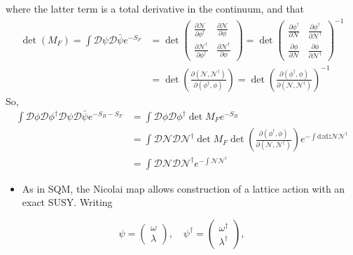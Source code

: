 where the latter term is a total derivative in the continuum, and that
\begin{align}
    \operatorname{det}(M_F) = \int \mathcal{D}\psi \mathcal{D} \bar{\psi}e^{-S_F} &= \operatorname{det} \begin{pmatrix}
        \frac{\partial \mathcal{N}}{\partial \phi^\dagger} & \frac{\partial \mathcal{N}}{\partial \phi} \\
         \frac{\partial \mathcal{N}^\dagger}{\partial \phi^\dagger} & \frac{\partial \mathcal{N}^\dagger}{\partial \phi}
    \end{pmatrix} = \operatorname{det}\begin{pmatrix}
        \frac{\partial \phi^\dagger}{\partial \mathcal{N}} & \frac{\partial \phi^\dagger}{\partial \mathcal{N}^\dagger} \\
        \frac{\partial \phi}{\partial \mathcal{N}} & \frac{\partial \phi}{\partial \mathcal{N}^\dagger}
    \end{pmatrix}^{-1} \nonumber\\
    &= \operatorname{det}\left(\frac{\partial(\mathcal{N}, \mathcal{N}^\dagger)}{\partial(\phi^\dagger, \phi)} \right) = \operatorname{det}\left(\frac{\partial(\phi^\dagger, \phi)} {\partial(\mathcal{N}, \mathcal{N}^\dagger)}\right)^{-1}
\end{align}
So,
\begin{align}
    \int \mathcal{D}\phi \mathcal{D}\phi^\dagger \mathcal{D}\psi \mathcal{D}\bar{\psi}e^{-S_B - S_F} &= \int \mathcal{D} \phi \mathcal{D}\phi^\dagger\operatorname{det}M_F e^{-S_B} \nonumber \\
    &= \int \mathcal{D}\mathcal{N}\mathcal{D}\mathcal{N}^\dagger \operatorname{det}M_F \operatorname{det}\left(\frac{\partial(\phi^\dagger, \phi)}{\partial(\mathcal{N}, \mathcal{N}^\dagger)}\right)e^{-\int \text{d}z \text{d}\bar{z} \mathcal{N} \mathcal{N}^\dagger} \nonumber \\
    &= \int \mathcal{D} \mathcal{N} \mathcal{D} \mathcal{N}^\dagger e^{-\int \mathcal{N} \mathcal{N}^\dagger}
\end{align}
\begin{itemize}
    \item As in SQM, the Nicolai map allows construction of a lattice action with an exact SUSY. Writing
\end{itemize}
\begin{equation}
    \psi = \begin{pmatrix}
        \omega \\
        \lambda
    \end{pmatrix}, \quad     \psi^\dagger = \begin{pmatrix}
        \omega^\dagger \\
        \lambda^\dagger
    \end{pmatrix},
\end{equation}
